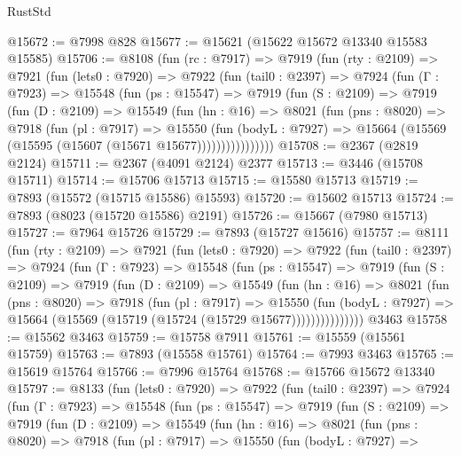 \begin{lexlean}{RustStd}
\begin{coremodule}
@15672 := @7998 @828
@15677 := @15621 (@15622 @15672 @13340 @15583 @15585)
@15706 := @8108
    (fun (rc : @7917) =>
    @7919
      (fun (rty : @2109) =>
      @7921
        (fun (lets0 : @7920) =>
        @7922
          (fun (tail0 : @2397) =>
          @7924
            (fun (Γ : @7923) =>
            @15548
              (fun (ps : @15547) =>
              @7919
                (fun (S : @2109) =>
                @7919
                  (fun (D : @2109) =>
                  @15549
                    (fun (hn : @16) =>
                    @8021
                      (fun (pns : @8020) =>
                      @7918
                        (fun (pl : @7917) =>
                        @15550
                          (fun (bodyL : @7927) =>
                          @15664 (@15569 (@15595 (@15607 (@15671 @15677))))))))))))))))
@15708 := @2367 (@2819 @2124)
@15711 := @2367 (@4091 @2124) @2377
@15713 := @3446 (@15708 @15711)
@15714 := @15706 @15713
@15715 := @15580 @15713
@15719 := @7893 (@15572 (@15715 @15586) @15593)
@15720 := @15602 @15713
@15724 := @7893 (@8023 (@15720 @15586) @2191)
@15726 := @15667 (@7980 @15713)
@15727 := @7964 @15726
@15729 := @7893 (@15727 @15616)
@15757 := @8111
    (fun (rty : @2109) =>
    @7921
      (fun (lets0 : @7920) =>
      @7922
        (fun (tail0 : @2397) =>
        @7924
          (fun (Γ : @7923) =>
          @15548
            (fun (ps : @15547) =>
            @7919
              (fun (S : @2109) =>
              @7919
                (fun (D : @2109) =>
                @15549
                  (fun (hn : @16) =>
                  @8021
                    (fun (pns : @8020) =>
                    @7918
                      (fun (pl : @7917) =>
                      @15550
                        (fun (bodyL : @7927) =>
                        @15664 (@15569 (@15719 (@15724 (@15729 @15677)))))))))))))))
    @3463
@15758 := @15562 @3463
@15759 := @15758 @7911
@15761 := @15559 (@15561 @15759)
@15763 := @7893 (@15558 @15761)
@15764 := @7993 @3463
@15765 := @15619 @15764
@15766 := @7996 @15764
@15768 := @15766 @15672 @13340
@15797 := @8133
    (fun (lets0 : @7920) =>
    @7922
      (fun (tail0 : @2397) =>
      @7924
        (fun (Γ : @7923) =>
        @15548
          (fun (ps : @15547) =>
          @7919
            (fun (S : @2109) =>
            @7919
              (fun (D : @2109) =>
              @15549
                (fun (hn : @16) =>
                @8021
                  (fun (pns : @8020) =>
                  @7918
                    (fun (pl : @7917) =>
                    @15550
                      (fun (bodyL : @7927) =>

\end{coremodule}
\end{lexlean}
